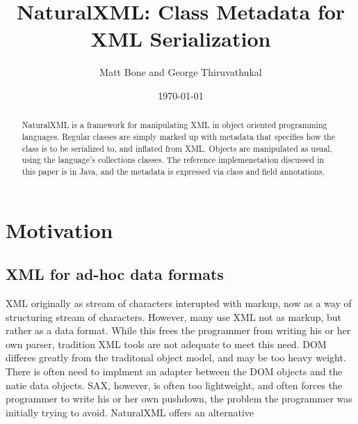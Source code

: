 \usepackage{fullpage}

\usepackage{listings}
\lstset{language=Java,
        basicstyle=\small}

\usepackage{graphicx}
\usepackage{hyperref}


\title{NaturalXML: Class Metadata for XML Serialization}
\author{Matt Bone and George Thiruvathukal}
\date{\today}



\maketitle

\begin{abstract}
NaturalXML is a framework for manipulating XML in object oriented
programming languages.  Regular classes are simply marked up with
metadata that specifies how the class is to be serialized to, and
inflated from XML.  Objects are manipulated as usual, using the
language's collections classes.  The reference implemenetation
discussed in this paper is in Java, and the metadata is expressed via
class and field annotations.
\end{abstract}

\tableofcontents

\pagebreak



\section{Motivation}
\subsection{XML for ad-hoc data formats}
XML originally as stream of characters interupted with markup, now as
a way of structuring stream of characters. %
However, many use XML not as markup, but rather as a data format.
While this frees the programmer from writing his or her own parser,
tradition XML tools are not adequate to meet this need.  DOM differes
greatly from the traditonal object model, and may be too heavy
weight. There is often need to implment an adapter between the DOM
objects and the natie data objects.  SAX, however, is often too
lightweight, and often forces the programmer to write his or her own
pushdown, the problem the programmer was initially trying to avoid.
NaturalXML offers an alternative


